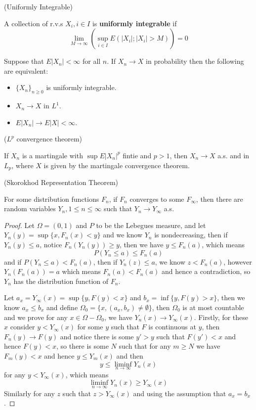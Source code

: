 \begin{definition}
    (Uniformly Integrable)\par
    A collection of r.v.s $X_i, i\in I$ is \textbf{uniformly integrable} if
    \[\lim_{M\to\infty} \left(\sup_{i\in I} E(|X_i|;|X_i| > M)\right) = 0\]    
\end{definition}

\begin{proposition}
    Suppose that $E|X_n| < \infty$ for all $n$. If $X_n \to X$ in probability then the following are equivalent:
    \begin{itemize}
        \item $\{X_n\}_{n\geq 0}$ is uniformly integrable.
        \item $X_n \to X$ in $L^1$.
        \item $E|X_n| \to E|X| < \infty$.
    \end{itemize}
\end{proposition}

\begin{theorem}
    ($L^p$ convergence theorem)\par
    If $X_n$ is a martingale with $\sup E|X_n|^p$ fintie and $p>1$, then $X_n \to X$ a.s. and in $L_p$, where $X$ is given by the martingale convergence theorem.
\end{theorem}

\begin{theorem}
    (Skorokhod Representation Theorem)\par
    For some distribution functions $F_n$, if $F_n$ converges to some $F_{\infty}$, then there are random variables $Y_n, 1\leq n \leq \infty$ such that $Y_n \to Y_{\infty} $ a.s.
\end{theorem}
\begin{proof}
    Let $\Omega = (0,1)$ and $P$ to be the Lebegues measure, and let $Y_n(y) = \sup\{x, F_n(x)< y\}$ and we know $Y_n$ is nondecreasing, then if $Y_n(y) \leq a$,  notice $F_n(Y_n(y)) \geq y$, then we have $y \leq F_n(a)$, which means
    \[
    P(Y_n \leq a) \leq F_n(a)
    \]
    and if $P(Y_n \leq a) < F_n(a)$, then if $Y_n(z) \leq a$, we know $z < F_n(a)$, however $Y_n(F_n(a)) = a$ which means $F_n(a) < F_n(a)$ and hence a contradiction, so $Y_n$ has the distribution function of $F_n$.\par
    Let $a_x = Y_{\infty}(x) = \sup\{y, F(y) < x\}$ and $b_x = \inf \{y, F(y) > x\}$, then we know $a_x \leq b_x$ and define $\Omega_0 = \{x, (a_x,b_x) \neq \emptyset\}$, then $\Omega_0$ is at most countable and we prove for any $x \in \Omega - \Omega_0$, we have $Y_n(x) \to Y_{\infty}(x)$. Firstly, for these $x$ consider $y < Y_{\infty}(x)$ for some $y$ such that $F$ is continuous at $y$, then $F_n(y) \to F(y)$ and notice there is some $y' > y$ such that $F(y')  <x$ and hence $F(y) < x$, so there is some $N$ such that for any $m\geq N$ we have $F_m(y) < x$ and hence $y \leq Y_m(x)$ and then
    \[
    y \leq \liminf_{n\to\infty} Y_n(x)
    \]
    for any $y < Y_{\infty}(x)$, which means
    \[
    \liminf_{n\to\infty} Y_n(x) \geq Y_{\infty}(x)
    \]
    Similarly for any $z$ such that $z > Y_{\infty}(x)$ and using the assumption that $a_x = b_x$.
\end{proof}


